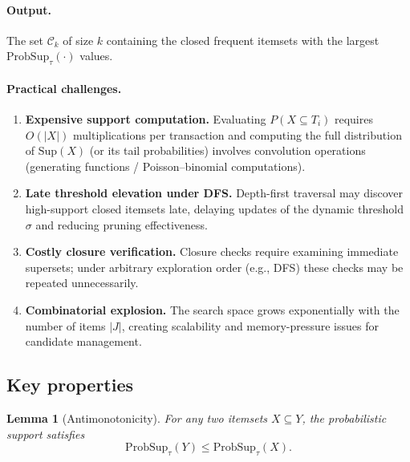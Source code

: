 \documentclass[10pt,letterpaper]{article}
\newtheorem{lemma}{Lemma}
\begin{document}
\paragraph{Output.} The set $\mathcal{C}_k$ of size $k$ containing the closed frequent itemsets with the largest $\mathrm{ProbSup}_{\tau}(\cdot)$ values.

\paragraph{Practical challenges.}
\begin{enumerate}
  \item \textbf{Expensive support computation.} Evaluating $P(X\subseteq T_i)$ requires $O(|X|)$ multiplications per transaction and computing the full distribution of $\mathrm{Sup}(X)$ (or its tail probabilities) involves convolution operations (generating functions / Poisson--binomial computations).
  \item \textbf{Late threshold elevation under DFS.} Depth-first traversal may discover high-support closed itemsets late, delaying updates of the dynamic threshold $\sigma$ and reducing pruning effectiveness.
  \item \textbf{Costly closure verification.} Closure checks require examining immediate supersets; under arbitrary exploration order (e.g., DFS) these checks may be repeated unnecessarily.
  \item \textbf{Combinatorial explosion.} The search space grows exponentially with the number of items $|J|$, creating scalability and memory-pressure issues for candidate management.
\end{enumerate}

\subsection*{Key properties}
\label{subsec:key_properties}

\begin{lemma}[Antimonotonicity]
\label{lem:antimonotonicity}
For any two itemsets $X \subseteq Y$, the probabilistic support satisfies
\begin{equation}
\mathrm{ProbSup}_{\tau}(Y) \leq \mathrm{ProbSup}_{\tau}(X).
\label{eq:antimonotonicity}
\end{equation}
\end{lemma}
\end{document}
